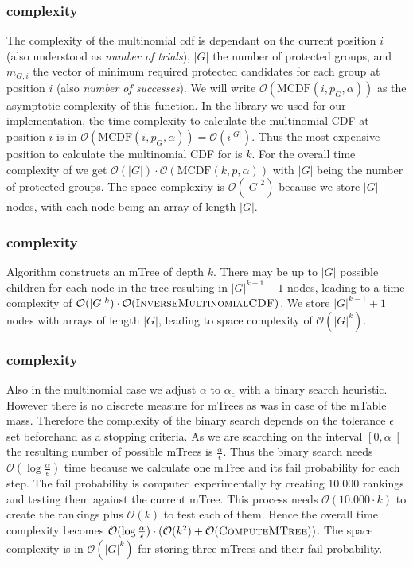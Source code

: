 \subsubsection{\algoImcdf complexity}\label{subsubsec:imcdf-complexity}
The complexity of the multinomial cdf is dependant on the current position $i$ (also understood as \textit{number of trials}), $|G|$ the number of protected groups, and $m_{G,i}$ the vector of minimum required protected candidates for each group at position $i$ (also \textit{number of successes}).
%
We will write $\mathcal{O}(\text{MCDF}(i,p_G,\alpha))$ as the asymptotic complexity of this function.
%
In the library we used for our implementation, the time complexity to calculate the multinomial CDF at position $i$ is in $\mathcal{O}(\text{MCDF}(i,p_G,\alpha)) = \mathcal{O}(i^{|G|})$.
%
Thus the most expensive position to calculate the multinomial CDF for is $k$.
%
For the overall time complexity of \algoImcdf we get $\mathcal{O}(|G|) \cdot \mathcal{O}(\text{MCDF}(k,p,\alpha ))$ with $|G|$ being the number of protected groups.
%
The space complexity is $\mathcal{O}(|G|^2)$ because we store $|G|$ nodes, with each node being an array of length $|G|$.
%
\subsubsection{\algoComputeMTree complexity}\label{subsubsec:mtree-complexity}
Algorithm \algoComputeMTree constructs an mTree of depth $k$.
%
There may be up to $|G|$ possible children for each node in the tree resulting in $|G|^{k-1} +1$ nodes, leading to a time complexity of $\mathcal{O}(|G|^{k}) \cdot \mathcal{O}(\text{{\sc InverseMultinomialCDF}})$.
%
We store $|G|^{k-1} +1$ nodes with arrays of length $|G|$, leading to space complexity of $\mathcal{O}(|G|^{k})$.
%
\subsubsection{\algoMultBinary complexity}\label{subsubsec:multBinary-complexity}
Also in the multinomial case we adjust $\alpha$ to $\alpha_c$ with a binary search heuristic.
%
However there is no discrete measure for mTrees as was in case of the mTable mass.
%
Therefore the complexity of the binary search depends on the tolerance $\epsilon$ set beforehand as a stopping criteria.
%
As we are searching on the interval $\left[0,\alpha\right[$ the resulting number of possible mTrees is $\frac{\alpha}{\epsilon}$.
%
Thus the binary search needs $\mathcal{O}(\log{}\frac{\alpha}{\epsilon})$ time because we calculate one mTree and its fail probability for each step.
%
The fail probability is computed experimentally by creating 10.000 rankings and testing them against the current mTree.
%
This process needs $\mathcal{O}(10.000 \cdot k)$ to create the rankings plus $\mathcal{O}(k)$ to test each of them.
%
Hence the overall time complexity becomes $\mathcal{O}(\log{}\frac{\alpha}{\epsilon}) \cdot (\mathcal{O}(k^2) + \mathcal{O}(\text{{\sc ComputeMTree}}))$.
%
The space complexity is in $\mathcal{O}(|G|^k)$ for storing three mTrees and their fail probability.
%
